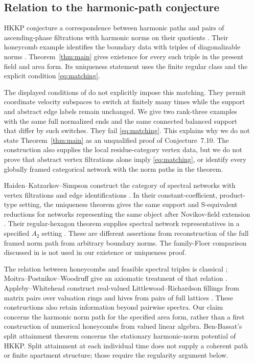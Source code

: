 \subsection{Relation to the harmonic-path conjecture}
HKKP conjecture a correspondence between harmonic paths and pairs of
ascending-phase filtrations with harmonic norms on their quotients
\cite[Conjecture~7.10]{HKKP26}. Their honeycomb example identifies the
boundary data with triples of diagonalizable norms
\cite[\S7.3]{HKKP26}. Theorem~\ref{thm:main} gives existence for every
such triple in the present field and area form. Its uniqueness statement
uses the finite regular class and the explicit condition
\eqref{eq:matching}.

The displayed conditions of \cite[Definition~7.8]{HKKP26} do not explicitly
impose this matching. They permit coordinate velocity subspaces to switch
at finitely many times while the support and abstract edge labels remain
unchanged. We give two rank-three examples with the same full normalized
ends and the same connected balanced support that differ by such switches.
They fail \eqref{eq:matching}. This explains why we do not state
Theorem~\ref{thm:main} as an unqualified proof of Conjecture~7.10.
The construction also supplies the local residue-category vertex data,
but we do not prove that abstract vertex filtrations alone imply
\eqref{eq:matching}, or identify every globally framed categorical network
with the norm paths in the theorem.

Haiden--Katzarkov--Simpson construct the category of spectral networks with
vertex filtrations and edge identifications
\cite[\S4.4]{HKS24}. In their constant-coefficient, product-type setting, the uniqueness
theorem gives the same support and S-equivalent reductions for networks
representing the same object after Novikov-field extension
\cite[Theorem~4.15]{HKS24}. Their regular-hexagon theorem supplies spectral
network representatives in a specified $A_2$ setting
\cite[Theorem~6.1]{HKS24}. These are different assertions from reconstruction
of the full framed norm path from arbitrary boundary norms. The family-Floer
comparison discussed in \cite[Remark~7.9]{HKKP26} is not used in our
existence or uniqueness proof.

The relation between honeycombs and feasible spectral triples is classical
\cite{KT99}; Moitra--Postnikov--Woodruff give an axiomatic treatment of
that relation \cite{MPW26}. Appleby--Whitehead construct real-valued Littlewood--Richardson
fillings from matrix pairs over valuation rings and hives from pairs
of full lattices \cite{AW13,AW18}. These constructions also retain
information beyond pairwise spectra. Our claim concerns the harmonic norm
path for the specified area form, rather than a first construction of
numerical honeycombs from valued linear algebra. Ben-Bassat's split
attainment theorem \cite[Theorem~1.1]{BB26} concerns the stationary harmonic-norm
potential of HKKP. Split attainment at each individual time does not supply
a coherent path or finite apartment structure; those require the
regularity argument below.

